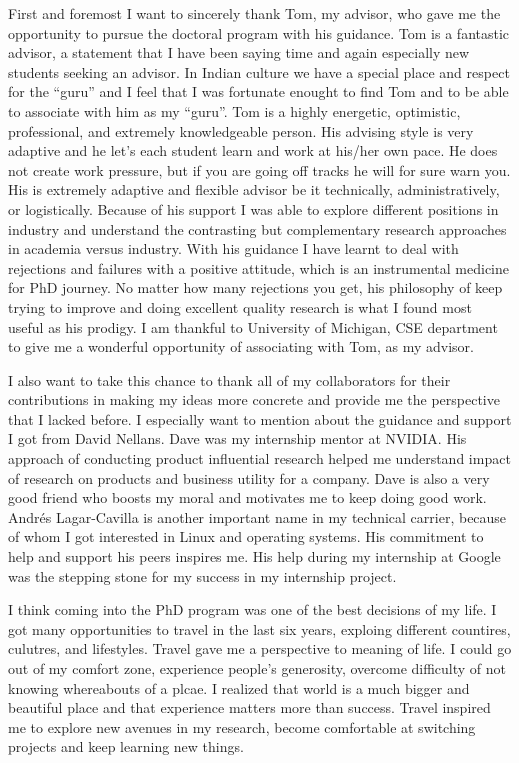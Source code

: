 First and foremost I want to sincerely thank Tom, my advisor, who gave me the
opportunity to pursue the doctoral program with his guidance. Tom is a fantastic
advisor, a statement that I have been saying time and again especially new
students seeking an advisor. In Indian culture we have a special place and
respect for the ``guru'' and I feel that I was fortunate enought to find Tom and
to be able to associate with him as my ``guru''. Tom is a highly energetic,
optimistic, professional, and extremely knowledgeable person. His advising style
is very adaptive and he let's each student learn and work at his/her own pace.
He does not create work pressure, but if you are going off tracks he will for
sure warn you. His is extremely adaptive and flexible advisor be it technically,
administratively, or logistically. Because of his support I was able to explore
different positions in industry and understand the contrasting but complementary
research approaches in academia versus industry. With his guidance I have learnt
to deal with rejections and failures with a positive attitude, which is an
instrumental medicine for PhD journey. No matter how many rejections you get,
his philosophy of keep trying to improve and doing excellent quality research is
what I found most useful as his prodigy. I am thankful to University of
Michigan, CSE department to give me a wonderful opportunity of associating with
Tom, as my advisor.

I also want to take this chance to thank all of my collaborators for their
contributions in making my ideas more concrete and provide me the perspective
that I lacked before. I especially want to mention about the guidance and
support I got from David Nellans. Dave was my internship mentor at NVIDIA.  His
approach of conducting product influential research helped me understand impact
of research on products and business utility for a company.  Dave is also a very
good friend who boosts my moral and motivates me to keep doing good work.
Andr\'es Lagar-Cavilla is another important name in my technical carrier,
because of whom I got interested in Linux and operating systems. His commitment
to help and support his peers inspires me. His help during my internship at
Google was the stepping stone for my success in my internship project.

I think coming into the PhD program was one of the best decisions of my life. I
got many opportunities to travel in the last six years, exploing different
countires, culutres, and lifestyles. Travel gave me a perspective to meaning of
life. I could go out of my comfort zone, experience people's generosity,
overcome difficulty of not knowing whereabouts of a plcae. I realized that world
is a much bigger and beautiful place and that experience matters more than
success. Travel inspired me to explore new avenues in my research, become
comfortable at switching projects and keep learning new things.

